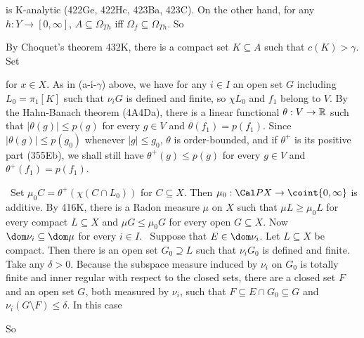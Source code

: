 {\noindent is K-analytic (422Ge,
422Hc,
423Ba,
423C).
On the other hand,
for any $h:Y\to[0,\infty]$, $A\subseteq\Omega_{Th}$ iff
$\Omega_f\subseteq\Omega_{Th}$.   So


\noindent By Choquet's theorem 432K, there is a compact set $K\subseteq A$
such that $c(K)>\gamma$.   Set


\noindent for $x\in X$.   As in
(a-i-$\gamma$) above, we have for any $i\in I$ an open set $G$ including
$L_0=\pi_1[K]$ such that $\nu_iG$ is
defined and finite, so $\chi L_0$ and $f_1$ belong to $V$.   By the
Hahn-Banach theorem (4A4Da), there is a linear functional
$\theta:V\to\Bbb R$ such that $|\theta(g)|\le p(g)$ for every $g\in V$ and
$\theta(f_1)=p(f_1)$.   Since $|\theta(g)|\le p(g_0)$ whenever
$|g|\le g_0$, $\theta$ is
order-bounded, and if $\theta^+$ is its positive part (355Eb),
we shall still have $\theta^+(g)\le p(g)$ for every $g\in V$ and
$\theta^+(f_1)=p(f_1)$.

\medskip

\qquad\grheadb\ Set $\mu_0C=\theta^+(\chi(C\cap L_0))$ for $C\subseteq X$.   Then
$\mu_0:\Cal PX\to\coint{0,\infty}$ is additive.   By 416K, there is a Radon
measure $\mu$ on $X$ such that $\mu L\ge\mu_0L$ for every compact
$L\subseteq X$ and $\mu G\le\mu_0G$ for every open $G\subseteq X$.
Now $\dom\nu_i\subseteq\dom\mu$ for every $i\in I$.
\Prf\ Suppose that $E\in\dom\nu_i$.    Let $L\subseteq X$ be
compact.   Then there is an open set $G_0\supseteq L$ such that $\nu_iG_0$
is defined and finite.   Take any $\delta>0$.
Because the subspace measure induced by $\nu_i$ on $G_0$ is
totally finite and inner regular with respect to the closed sets,
there are a closed set $F$ and an open set $G$, both
measured by $\nu_i$, such that $F\subseteq E\cap G_0\subseteq G$ and
$\nu_i(G\setminus F)\le\delta$.  In this case


\noindent So


}

